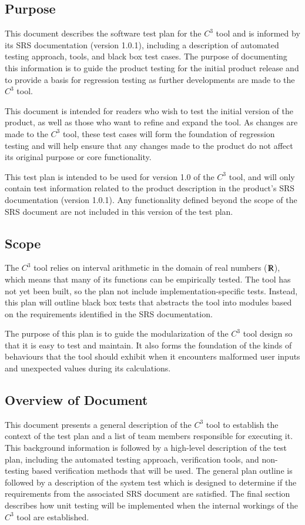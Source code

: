 \documentclass[12pt, titlepage]{article}
\newcommand{\prognameAbbrv}{$C^{3}$}
\newcommand{\srsVersion}{1.0.1}
\begin{document}
\subsection{Purpose}
This document describes the software test plan for the \prognameAbbrv{} tool 
and is informed by its SRS documentation (version \srsVersion{}), including a 
description of automated testing approach, tools, and black box test cases. The 
purpose of documenting this information is to guide the product testing for the 
initial product release and to provide a basis for regression testing as 
further developments are made to the \prognameAbbrv{} tool.

This document is intended for readers who wish to test the initial version of 
the product, as well as those who want to refine and expand the tool. As 
changes are made to the \prognameAbbrv{} tool, these test cases will form the 
foundation of regression testing and will help ensure that any changes made to 
the product do not affect its original purpose or core functionality.

This test plan is intended to be used for version 1.0 of the \prognameAbbrv{} 
tool, and will only contain test information related to the product description 
in the product's SRS documentation (version \srsVersion{}). Any functionality 
defined beyond the scope of the SRS document are not included in this version 
of the test plan.

\subsection{Scope}
The \prognameAbbrv{} tool relies on interval arithmetic in the domain of real 
numbers ($\varmathbb{R}$), which means that many of its functions can be 
empirically tested. The tool has not yet been built, so the plan not include 
implementation-specific tests. Instead, this plan will outline black box tests 
that abstracts the tool into modules based on the requirements identified in 
the SRS documentation.

The purpose of this plan is to guide the modularization of the \prognameAbbrv{} 
tool design so that it is easy to test and maintain. It also forms the 
foundation of the kinds of behaviours that the tool should exhibit when it 
encounters malformed  user inputs and unexpected values during its calculations.

\subsection{Overview of Document}
This document presents a general description of the \prognameAbbrv{} tool to 
establish the context of the test plan and a list of team members responsible 
for executing it. This background information is followed by a high-level 
description of the test plan, including the automated testing approach, 
verification tools, and non-testing based verification methods that will be 
used. The general plan outline is followed by a description of the system test 
which is designed to determine if the requirements from the associated SRS 
document are satisfied. The final section describes how unit testing will be 
implemented when the internal workings of the \prognameAbbrv{} tool are 
established.
\end{document}
